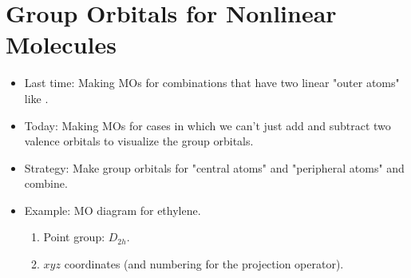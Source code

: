 \documentclass[../notes.tex]{subfiles}
\begin{document}
\section{Group Orbitals for Nonlinear Molecules}
\begin{itemize}
    \item {}Last time: Making MOs for combinations that have two linear "outer atoms" like .
    \item Today: Making MOs for cases in which we can't just add and subtract two valence orbitals to visualize the group orbitals.
    \item Strategy: Make group orbitals for "central atoms" and "peripheral atoms" and combine.
    \item Example: MO diagram for ethylene.
    \begin{enumerate}
        \item Point group: $D_{2h}$.
        \item $xyz$ coordinates (and numbering for the projection operator).
        \begin{figure}[h!]
            \centering
\end{figure}
\end{enumerate}
\end{itemize}
\end{document}
